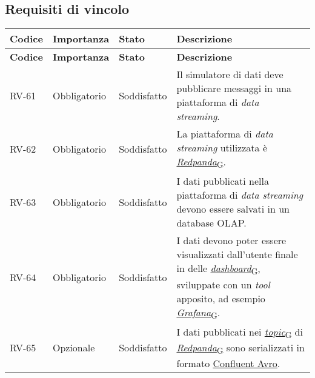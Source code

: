 \subsection{Requisiti di vincolo}
\begin{longtable}{|>{\centering\arraybackslash}m{}|>{\centering\arraybackslash}m{}|>{\centering\arraybackslash}m{}|>{\centering\arraybackslash}m{}|}
	\hline
	\textbf{Codice} & \textbf{Importanza} & \textbf{Stato}& \textbf{Descrizione}\\\hline
	\endfirsthead
	\hline
	\textbf{Codice} & \textbf{Importanza} & \textbf{Stato}& \textbf{Descrizione}\\\hline
	\endhead
	\hline
	RV-61           & Obbligatorio        & Soddisfatto & Il simulatore di dati deve pubblicare messaggi in una piattaforma di \textit{data streaming}.
	\\\hline
	RV-62           & Obbligatorio        & Soddisfatto                                                                                                           & La piattaforma di \textit{data streaming} utilizzata è \href{https://7last.github.io/docs/pb/documentazione-interna/glossario\#redpanda}{\textit{Redpanda}\textsubscript{G}}.
	\\\hline
	RV-63           & Obbligatorio        & Soddisfatto & I dati pubblicati nella piattaforma di \textit{data streaming} devono essere salvati in un database OLAP.
	\\\hline
	RV-64           & Obbligatorio        & Soddisfatto & I dati devono poter essere visualizzati dall'utente finale in delle \href{https://7last.github.io/docs/pb/documentazione-interna/glossario\#dashboard}{\textit{dashboard}\textsubscript{G}}, sviluppate con un \textit{tool} apposito, ad esempio \href{https://7last.github.io/docs/pb/documentazione-interna/glossario\#grafana}{\textit{Grafana}\textsubscript{G}}.
	\\\hline
	RV-65           & Opzionale           & Soddisfatto                                                                                                           & I dati pubblicati nei \href{https://7last.github.io/docs/pb/documentazione-interna/glossario\#topic}{\textit{topic}\textsubscript{G}} di \href{https://7last.github.io/docs/pb/documentazione-interna/glossario\#redpanda}{\textit{Redpanda}\textsubscript{G}} sono serializzati in formato \href{https://docs.confluent.io/platform/current/schema-registry/fundamentals/serdes-develop/serdes-avro.html}{\underline{Confluent Avro}}.
	\\\hline

\end{longtable}
